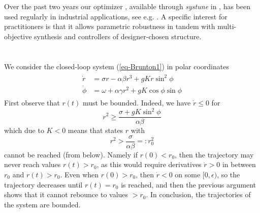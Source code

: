 \documentclass[12pt, a4paper,reqno]{amsart}
\theoremstyle{definition}
\begin{document}
Over the past two years our optimizer  \cite{an:05,apkarian2006nonsmooth,apkarianNoll2017worst},
available through {\it systune} in \cite{MatlabRobust}, has been used regularly in
industrial applications, see e.g.
\cite{li2023multivariable,lim2022active,Vilarino2022,LeGuehennec2020,Maheshwari2022,deSousa2021,Asghar2023}. A 
specific interest for practitioners
is that it allows parametric robustness in tandem with multi-objective synthesis and controllers of designer-chosen  structure. 


\appendix
\renewcommand{\thesection}{\Alph{section}}

\section{}\label{appendix-A}
We consider the closed-loop system (\ref{eq-Brunton1}) in polar coordinates
%
\begin{align}
\label{start}
\begin{split}
    \dot{r}& =  \sigma r - \alpha \beta r^3 + g K r\sin^2 \phi\\
     \dot{\phi} &= \omega + \alpha \gamma r^2  + g K \cos\phi \sin\phi 
     \end{split}
\end{align} 
%
First observe that $r(t)$ must be bounded. Indeed, we have $\dot{r} \leq 0$ for
$$
r^2 \geq \frac{\sigma+gK\sin^2\phi}{\alpha \beta}
$$
which due to $K < 0$ means that states $r$ with
$$
r^2 > \frac{\sigma}{\alpha\beta}  =: r_0^2
$$
cannot be reached (from below).
Namely if $r(0) < r_0$, then the trajectory may never reach values $r(t) > r_0$, as this would require derivatives
$\dot{r}>0$ in between $r_0$ and $r(t) > r_0$. Even when $r(0) > r_0$, then $\dot{r} < 0$ on some $[0,\epsilon)$, so the trajectory 
decreases until $r(t) = r_0$ is reached, and then the previous argument shows that it cannot rebounce to values $>r_0$. 
In conclusion, the trajectories of the system are bounded.
\end{document}
